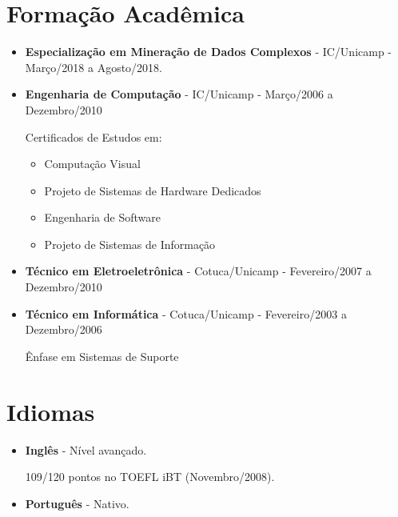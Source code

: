 \documentclass[a4paper,10pt]{article}
\begin{document}
  \section{Formação Acadêmica}
    \begin{itemize}

      \item
        \textbf{Especialização em Mineração de Dados Complexos} - IC/Unicamp - Março/2018 a Agosto/2018.

      \item
        \textbf{Engenharia de Computação} - IC/Unicamp - Março/2006 a Dezembro/2010


        Certificados de Estudos em:
        \begin{itemize}
          \item Computação Visual
          \item Projeto de Sistemas de Hardware Dedicados
          \item Engenharia de Software
          \item Projeto de Sistemas de Informação
        \end{itemize}



      \item  
        \textbf{Técnico em Eletroeletrônica} - Cotuca/Unicamp - Fevereiro/2007 a Dezembro/2010


      \item  
        \textbf{Técnico em Informática} - Cotuca/Unicamp - Fevereiro/2003 a Dezembro/2006

        Ênfase em Sistemas de Suporte


    \end{itemize}



  \section{Idiomas}
    \begin{itemize}
      \item  
        \textbf{Inglês} - Nível avançado.

        109/120 pontos no TOEFL iBT (Novembro/2008).

      \item  
        \textbf{Português} - Nativo.
    \end{itemize}
\end{document}
